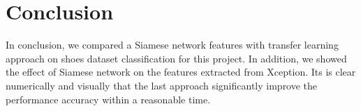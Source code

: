 \section{Conclusion}

In conclusion, we compared a Siamese network features with transfer learning approach on shoes dataset classification for this project. In addition, we showed the effect of Siamese network on the features extracted from Xception. Its is clear numerically and visually that the last approach significantly improve the performance accuracy within a reasonable time. 